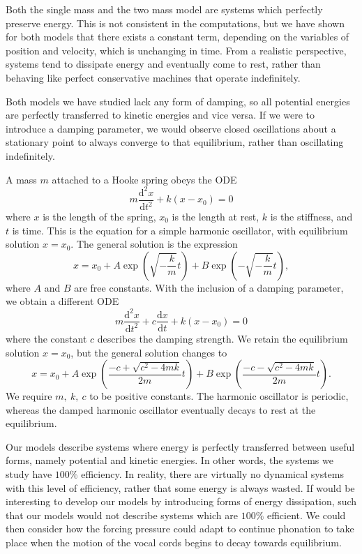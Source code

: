 \documentclass{report}
\begin{document}
Both the single mass and the two mass model are systems which perfectly preserve energy.
This is not consistent in the computations,
but we have shown for both models that there exists a constant term,
depending on the variables of position and velocity,
which is unchanging in time.
From a realistic perspective,
systems tend to dissipate energy and eventually come to rest,
rather than behaving like perfect conservative machines that operate indefinitely.

Both models we have studied lack any form of damping,
so all potential energies are perfectly transferred to kinetic energies and vice versa.
If we were to introduce a damping parameter,
we would observe closed oscillations about a stationary point to always converge to that equilibrium,
rather than oscillating indefinitely.

A mass $m$ attached to a Hooke spring obeys the ODE
\begin{equation*}
	m\frac{\mathrm{d}^2 x}{\mathrm{d}t^2} + k(x-x_0) = 0
\end{equation*}
where $x$ is the length of the spring, $x_0$ is the length at rest,
$k$ is the stiffness,
and $t$ is time.
This is the equation for a simple harmonic oscillator,
with equilibrium solution $x=x_0$.
The general solution is the expression
\begin{equation*}
	x = x_0 + A\exp \left(
		\sqrt{-\frac{k}{m}}t
	\right) + B\exp \left(
		-\sqrt{-\frac{k}{m}}t
	\right),
\end{equation*}
where $A$ and $B$ are free constants.
With the inclusion of a damping parameter,
we obtain a different ODE
\begin{equation*}
	m\frac{\mathrm{d}^2 x}{\mathrm{d}t^2} + c\frac{\mathrm{d}x}{\mathrm{d}t} + k(x-x_0) = 0
\end{equation*}
where the constant $c$ describes the damping strength.
We retain the equilibrium solution $x=x_0$, but the general solution changes to
\begin{equation*}
	x = x_0 + A \exp \left(
		\frac{-c+\sqrt{c^2-4mk}}{2m}t
	\right) + B \exp \left(
		\frac{-c-\sqrt{c^2-4mk}}{2m}t
	\right).
\end{equation*}
We require $m,~k,~c$ to be positive constants.
The harmonic oscillator is periodic,
whereas the damped harmonic oscillator eventually decays to rest at the equilibrium.

Our models describe systems where energy is perfectly transferred between useful forms,
namely potential and kinetic energies.
In other words, the systems we study have $100\%$ efficiency.
In reality, there are virtually no dynamical systems with this level of efficiency,
rather that some energy is always wasted.
If would be interesting to develop our models by introducing forms of energy dissipation,
such that our models would not describe systems which are $100\%$ efficient.
We could then consider how the forcing pressure could adapt to continue phonation to take place when the motion of the vocal cords begins to decay towards equilibrium.
\end{document}
